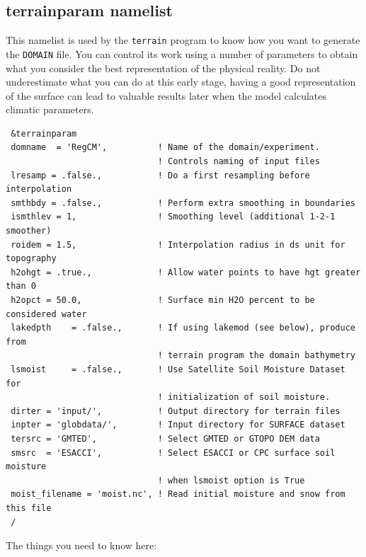 \subsection{terrainparam namelist}
\label{terparam}
This namelist is used by the \verb=terrain= program to know how you want
to generate the \verb=DOMAIN= file. You can control its work using a number of
parameters to obtain what you consider the best representation of the
physical reality. Do not underestimate what you can do at this early stage,
having a good representation of the surface can lead to valuable results
later when the model calculates climatic parameters.

{\footnotesize
\begin{Verbatim}
 &terrainparam
 domname  = 'RegCM',          ! Name of the domain/experiment.
                              ! Controls naming of input files
 lresamp = .false.,           ! Do a first resampling before interpolation
 smthbdy = .false.,           ! Perform extra smoothing in boundaries
 ismthlev = 1,                ! Smoothing level (additional 1-2-1 smoother)
 roidem = 1.5,                ! Interpolation radius in ds unit for topography
 h2ohgt = .true.,             ! Allow water points to have hgt greater than 0
 h2opct = 50.0,               ! Surface min H2O percent to be considered water
 lakedpth    = .false.,       ! If using lakemod (see below), produce from
                              ! terrain program the domain bathymetry
 lsmoist     = .false.,       ! Use Satellite Soil Moisture Dataset for
                              ! initialization of soil moisture.
 dirter = 'input/',           ! Output directory for terrain files
 inpter = 'globdata/',        ! Input directory for SURFACE dataset
 tersrc = 'GMTED',            ! Select GMTED or GTOPO DEM data
 smsrc  = 'ESACCI',           ! Select ESACCI or CPC surface soil moisture
                              ! when lsmoist option is True
 moist_filename = 'moist.nc', ! Read initial moisture and snow from this file
 /
\end{Verbatim}
}

The things you need to know here:

